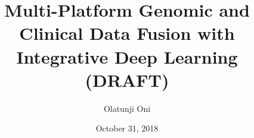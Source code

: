 \documentclass[12pt, twoside]{report}
\title{Multi-Platform Genomic and Clinical Data Fusion with Integrative Deep Learning (DRAFT)}
\author{Olatunji Oni}
\date{October 31, 2018}
\begin{document}
\maketitle


\frontmatter{}
    \tableofcontents
    \listoffigures
    

\mainmatter{}
    
    
\backmatter{}
    \printbibliography
\end{document}

